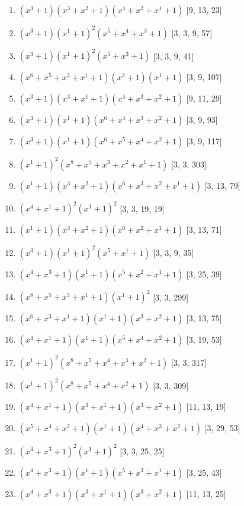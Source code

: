 \documentclass[10pt,twocolumn]{article}
\begin{document}
\begin{enumerate}
\item $(x^{3} + 1)(x^{3} + x^{2} + 1)(x^{4} + x^{2} + x^{1} + 1)$  [9, 13, 23]
\item $(x^{3} + 1)(x^{1} + 1)^{2}(x^{5} + x^{4} + x^{3} + 1)$  [3, 3, 9, 57]
\item $(x^{3} + 1)(x^{1} + 1)^{2}(x^{5} + x^{3} + 1)$  [3, 3, 9, 41]
\item $(x^{6} + x^{5} + x^{3} + x^{1} + 1)(x^{3} + 1)(x^{1} + 1)$  [3, 9, 107]
\item $(x^{3} + 1)(x^{3} + x^{1} + 1)(x^{4} + x^{3} + x^{2} + 1)$  [9, 11, 29]
\item $(x^{3} + 1)(x^{1} + 1)(x^{6} + x^{4} + x^{3} + x^{2} + 1)$  [3, 9, 93]
\item $(x^{3} + 1)(x^{1} + 1)(x^{6} + x^{5} + x^{4} + x^{2} + 1)$  [3, 9, 117]
\item $(x^{1} + 1)^{2}(x^{8} + x^{5} + x^{3} + x^{2} + x^{1} + 1)$  [3, 3, 303]
\item $(x^{1} + 1)(x^{3} + x^{2} + 1)(x^{6} + x^{3} + x^{2} + x^{1} + 1)$  [3, 13, 79]
\item $(x^{4} + x^{1} + 1)^{2}(x^{1} + 1)^{2}$  [3, 3, 19, 19]
\item $(x^{1} + 1)(x^{3} + x^{2} + 1)(x^{6} + x^{2} + x^{1} + 1)$  [3, 13, 71]
\item $(x^{3} + 1)(x^{1} + 1)^{2}(x^{5} + x^{1} + 1)$  [3, 3, 9, 35]
\item $(x^{4} + x^{3} + 1)(x^{1} + 1)(x^{5} + x^{2} + x^{1} + 1)$  [3, 25, 39]
\item $(x^{8} + x^{5} + x^{3} + x^{1} + 1)(x^{1} + 1)^{2}$  [3, 3, 299]
\item $(x^{6} + x^{3} + x^{1} + 1)(x^{1} + 1)(x^{3} + x^{2} + 1)$  [3, 13, 75]
\item $(x^{4} + x^{1} + 1)(x^{1} + 1)(x^{5} + x^{4} + x^{2} + 1)$  [3, 19, 53]
\item $(x^{1} + 1)^{2}(x^{8} + x^{5} + x^{4} + x^{3} + x^{2} + 1)$  [3, 3, 317]
\item $(x^{1} + 1)^{2}(x^{8} + x^{5} + x^{4} + x^{2} + 1)$  [3, 3, 309]
\item $(x^{4} + x^{1} + 1)(x^{3} + x^{1} + 1)(x^{3} + x^{2} + 1)$  [11, 13, 19]
\item $(x^{5} + x^{4} + x^{2} + 1)(x^{1} + 1)(x^{4} + x^{3} + x^{2} + 1)$  [3, 29, 53]
\item $(x^{4} + x^{3} + 1)^{2}(x^{1} + 1)^{2}$  [3, 3, 25, 25]
\item $(x^{4} + x^{3} + 1)(x^{1} + 1)(x^{5} + x^{3} + x^{1} + 1)$  [3, 25, 43]
\item $(x^{4} + x^{3} + 1)(x^{3} + x^{1} + 1)(x^{3} + x^{2} + 1)$  [11, 13, 25]

\end{enumerate}
\end{document}
